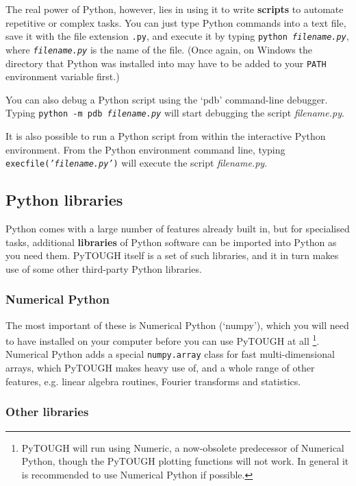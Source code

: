 The real power of Python, however, lies in using it to write \textbf{scripts} to automate repetitive or complex tasks.  You can just type Python commands into a text file, save it with the file extension \texttt{.py}, and execute it by typing \texttt{python \emph{filename.py}}, where \texttt{\emph{filename.py}} is the name of the file.  (Once again, on Windows the directory that Python was installed into may have to be added to your \texttt{PATH} environment variable first.)

You can also debug a Python script using the `pdb' command-line debugger.  Typing \texttt{python -m pdb \emph{filename.py}} will start debugging the script \emph{filename.py}.

It is also possible to run a Python script from within the interactive Python environment.  From the Python environment command line, typing \texttt{execfile(\emph{'filename.py'})} will execute the script \emph{filename.py}.

\subsection{Python libraries}
\label{pylibraries}

Python comes with a large number of features already built in, but for specialised tasks, additional \textbf{libraries} of Python software can be imported into Python as you need them.  PyTOUGH itself is a set of such libraries, and it in turn makes use of some other third-party Python libraries.

\subsubsection{Numerical Python}

The most important of these is Numerical Python (`numpy'), which you will need to have installed on your computer before you can use PyTOUGH at all \footnote{PyTOUGH will run using Numeric, a now-obsolete predecessor of Numerical Python, though the PyTOUGH plotting functions will not work.  In general it is recommended to use Numerical Python if possible.}.  Numerical Python adds a special \texttt{numpy.array} class for fast multi-dimensional arrays, which PyTOUGH makes heavy use of, and a whole range of other features, e.g. linear algebra routines, Fourier transforms and statistics.

\subsubsection{Other libraries}

